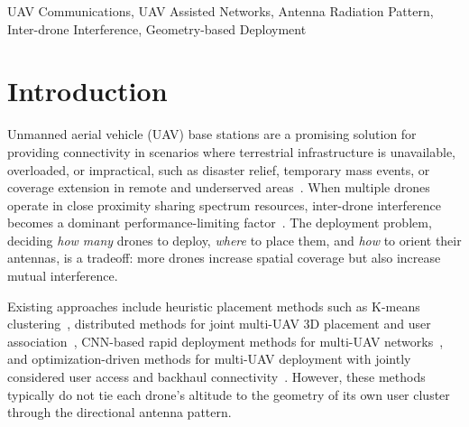 \documentclass[conference]{IEEEtran}
\begin{document}
\begin{abstract}
\end{abstract}

\begin{IEEEkeywords}
UAV Communications, UAV Assisted Networks, Antenna Radiation Pattern, Inter-drone Interference, Geometry-based Deployment
\end{IEEEkeywords}

\section{Introduction}
\label{sec:intro}

Unmanned aerial vehicle (UAV) base stations are a promising solution for providing connectivity in scenarios where terrestrial infrastructure is unavailable, overloaded, or impractical, such as disaster relief, temporary mass events, or coverage extension in remote and underserved areas~\cite{qiu2019,elhammouti2019,hydher2020}.
When multiple drones operate in close proximity sharing spectrum resources, inter-drone interference becomes a dominant performance-limiting factor~\cite{khuwaja2019}. The deployment problem, deciding \emph{how many} drones to deploy, \emph{where} to place them, and \emph{how} to orient their antennas, is a tradeoff: more drones increase spatial coverage but also increase mutual interference.

Existing approaches include heuristic placement methods such as K-means clustering~\cite{consul2024}, distributed methods for joint multi-UAV 3D placement and user association~\cite{elhammouti2019}, CNN-based rapid deployment methods for multi-UAV networks~\cite{wang2024}, and optimization-driven methods for multi-UAV deployment with jointly considered user access and backhaul connectivity~\cite{wang2025multiuav}. However, these methods typically do not tie each drone's altitude to the geometry of its own user cluster through the directional antenna pattern.
\end{document}

